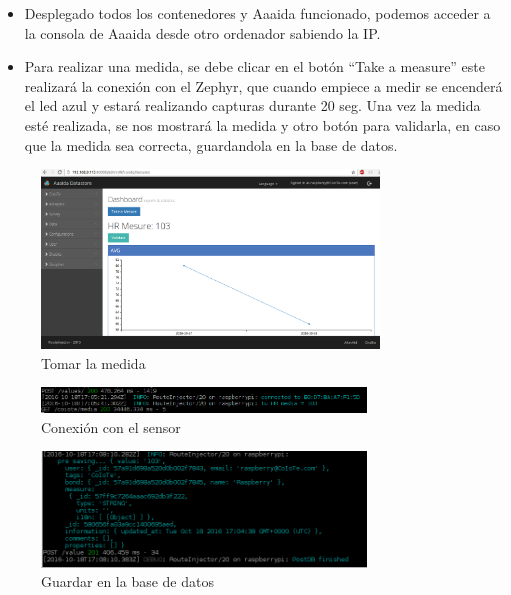 \begin{itemize}
\item Desplegado todos los contenedores y Aaaida funcionado, podemos acceder a la consola de Aaaida desde otro ordenador sabiendo la IP. 
\item Para realizar una medida, se debe clicar en el botón “Take a measure” este realizará la conexión con el Zephyr, que cuando empiece a medir se encenderá el led azul y estará realizando capturas durante 20 seg. Una vez la medida esté realizada, se nos mostrará la medida y otro botón para validarla, en caso que la medida sea correcta, guardandola en la base de datos. 
\end{itemize}


\begin{figure}[htb]
\begin{center}
\includegraphics[width=0.8\textwidth]{./setup/conect1}
\caption{Tomar la medida}
\end{center}
\end{figure}
\pagebreak

\begin{figure}[htb]
\begin{center}
\includegraphics[width=0.77\textwidth]{./setup/conexion1}
\caption{Conexión con el sensor}
\end{center}
\end{figure}

\begin{figure}[htb]
\begin{center}
\includegraphics[width=0.77\textwidth]{./setup/conexion2}
\caption{Guardar en la base de datos}
\end{center}
\end{figure}

